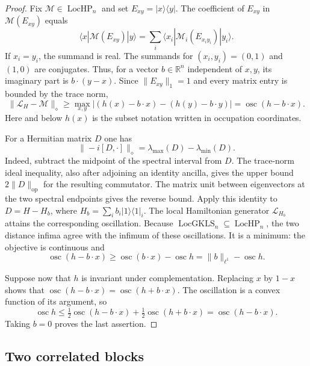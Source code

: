 \documentclass[reqno]{amsart}
\theoremstyle{definition}
\theoremstyle{remark}
\newcommand{\R}{\mathbb R}
\begin{document}
\begin{proof}
Fix $\mathcal M\in\operatorname{LocHP}_n$ and set
$E_{xy}=|x\rangle\langle y|$.  The coefficient of $E_{xy}$ in
$\mathcal M(E_{xy})$ equals
\[
 \langle x|\mathcal M(E_{xy})|y\rangle
 =\sum_i\langle x_i|\mathcal M_i(E_{x_i y_i})|y_i\rangle.
\]
If $x_i=y_i$, the summand is real.  The summands for $(x_i,y_i)=(0,1)$
and $(1,0)$ are conjugates.  Thus, for a vector $b\in\R^n$ independent
of $x,y$, its imaginary part is $b\cdot(y-x)$.  Since
$\|E_{xy}\|_1=1$ and every matrix entry is bounded by the trace norm,
\[
 \|\mathcal L_H-\mathcal M\|_\diamond
 \geq \max_{x,y}
       |(h(x)-b\cdot x)-(h(y)-b\cdot y)|
 =\operatorname{osc}(h-b\cdot x).
\]
Here and below $h(x)$ is the subset notation written in occupation
coordinates.

For a Hermitian matrix $D$ one has
\begin{equation}
 \|-i[D,\cdot]\|_\diamond
   =\lambda_{\max}(D)-\lambda_{\min}(D).
 \label{rob:commutator-norm}
\end{equation}
Indeed, subtract the midpoint of the spectral interval from $D$.
The trace-norm ideal inequality, also after adjoining an identity
ancilla, gives the upper bound $2\|D\|_{\mathrm{op}}$ for the resulting
commutator.  The matrix unit between eigenvectors at the two spectral
endpoints gives the reverse bound.  Apply this identity to
$D=H-H_b$, where
$H_b=\sum_i b_i|1\rangle\langle1|_i$.
The local Hamiltonian generator $\mathcal L_{H_b}$ attains the
corresponding oscillation.  Because
$\operatorname{LocGKLS}_n\subseteq\operatorname{LocHP}_n$,
the two distance infima agree with the infimum of these oscillations.
It is a minimum: the objective is continuous and
\[
 \operatorname{osc}(h-b\cdot x)
 \geq \operatorname{osc}(b\cdot x)-\operatorname{osc}h
 =\|b\|_{\ell^1}-\operatorname{osc}h.
\]

Suppose now that $h$ is invariant under complementation.  Replacing
$x$ by $1-x$ shows that
$\operatorname{osc}(h-b\cdot x)=\operatorname{osc}(h+b\cdot x)$.
The oscillation is a convex function of its argument, so
\[
 \operatorname{osc}h
 \leq \tfrac12\operatorname{osc}(h-b\cdot x)
       +\tfrac12\operatorname{osc}(h+b\cdot x)
 =\operatorname{osc}(h-b\cdot x).
\]
Taking $b=0$ proves the last assertion.
\end{proof}

\subsection{Two correlated blocks}
\end{document}
